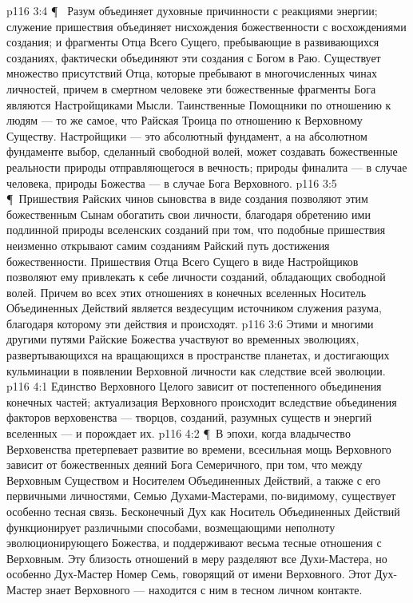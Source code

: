 \vs p116 3:4 \P\ \bibnobreakspace {} Разум объединяет духовные причинности с реакциями энергии; служение пришествия объединяет нисхождения божественности с восхождениями создания; и фрагменты Отца Всего Сущего, пребывающие в развивающихся созданиях, фактически объединяют эти создания с Богом в Раю. Существует множество присутствий Отца, которые пребывают в многочисленных чинах личностей, причем в смертном человеке эти божественные фрагменты Бога являются Настройщиками Мысли. Таинственные Помощники по отношению к людям --- то же самое, что Райская Троица по отношению к Верховному Существу. Настройщики --- это абсолютный фундамент, а на абсолютном фундаменте выбор, сделанный свободной волей, может создавать божественные реальности природы отправляющегося в вечность; природы финалита --- в случае человека, природы Божества --- в случае Бога Верховного.
\vs p116 3:5 \P\ Пришествия Райских чинов сыновства в виде создания позволяют этим божественным Сынам обогатить свои личности, благодаря обретению ими подлинной природы вселенских созданий при том, что подобные пришествия неизменно открывают самим созданиям Райский путь достижения божественности. Пришествия Отца Всего Сущего в виде Настройщиков позволяют ему привлекать к себе личности созданий, обладающих свободной волей. Причем во всех этих отношениях в конечных вселенных Носитель Объединенных Действий является вездесущим источником служения разума, благодаря которому эти действия и происходят.
\vs p116 3:6 Этими и многими другими путями Райские Божества участвуют во временных эволюциях, развертывающихся на вращающихся в пространстве планетах, и достигающих кульминации в появлении Верховной личности как следствие всей эволюции.
\vs p116 4:1 Единство Верховного Целого зависит от постепенного объединения конечных частей; актуализация Верховного происходит вследствие объединения факторов верховенства --- творцов, созданий, разумных существ и энергий вселенных --- и порождает их.
\vs p116 4:2 \P\ В эпохи, когда владычество Верховенства претерпевает развитие во времени, всесильная мощь Верховного зависит от божественных деяний Бога Семеричного, при том, что между Верховным Существом и Носителем Объединенных Действий, а также с его первичными личностями, Семью Духами\hyp{}Мастерами, по\hyp{}видимому, существует особенно тесная связь. Бесконечный Дух как Носитель Объединенных Действий функционирует различными способами, возмещающими неполноту эволюционирующего Божества, и поддерживают весьма тесные отношения с Верховным. Эту близость отношений в меру разделяют все Духи\hyp{}Мастера, но особенно Дух\hyp{}Мастер Номер Семь, говорящий от имени Верховного. Этот Дух\hyp{}Мастер знает Верховного --- находится с ним в тесном личном контакте.
